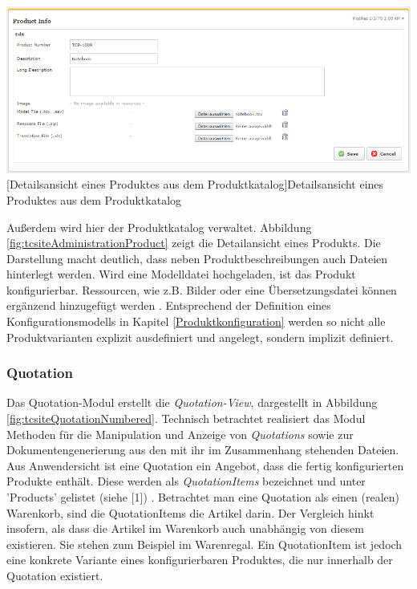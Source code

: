 \documentclass[11pt, a4paper, titlepage, listof=totoc, bibliography=totoc, index=totoc, twoside, openright, headings=normal]{scrreprt}
\begin{document}
\vspace{1em}
\begin{minipage}{\linewidth}
	\centering
	\includegraphics[width=0.95\linewidth]{Abbildungen/tcsiteAdministrationProduct.PNG}
	[Detailsansicht eines Produktes aus dem Produktkatalog]{Detailsansicht eines Produktes aus dem Produktkatalog}
	\label{fig:tcsiteAdministrationProduct}
\end{minipage}
\vspace{0.3em}

Außerdem wird hier der Produktkatalog verwaltet. Abbildung \ref{fig:tcsiteAdministrationProduct} zeigt die Detailansicht eines Produkts. Die Darstellung macht deutlich, dass neben Produktbeschreibungen auch Dateien hinterlegt werden. Wird eine Modelldatei hochgeladen, ist das Produkt konfigurierbar. Ressourcen, wie z.B. Bilder oder eine Übersetzungsdatei können ergänzend hinzugefügt werden \citep{tactonTCsiteReferenceManual}. Entsprechend der Definition eines Konfigurationsmodells in Kapitel \ref{Produktkonfiguration} werden so nicht alle Produktvarianten explizit ausdefiniert und angelegt, sondern implizit definiert.

\subsubsection*{Quotation}
Das Quotation-Modul erstellt die \emph{Quotation-View}, dargestellt in Abbildung \ref{fig:tcsiteQuotationNumbered}. Technisch betrachtet realisiert das Modul Methoden für die Manipulation und Anzeige von \emph{Quotations} sowie zur Dokumentengenerierung aus den mit ihr im Zusammenhang stehenden Dateien. Aus Anwendersicht ist eine Quotation ein Angebot, dass die fertig konfigurierten Produkte enthält. Diese werden als \emph{QuotationItems} bezeichnet und unter 'Products' gelistet (siehe [1]) \citep{tactonTCsiteDevelopmentManual}. Betrachtet man eine Quotation als einen (realen) Warenkorb, sind die QuotationItems die Artikel darin. Der Vergleich hinkt insofern, als dass die Artikel im Warenkorb auch unabhängig von diesem existieren. Sie stehen zum Beispiel im Warenregal. Ein QuotationItem ist jedoch eine konkrete Variante eines konfigurierbaren Produktes, die nur innerhalb der Quotation existiert.
\end{document}
